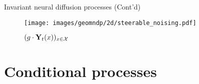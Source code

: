 \begin{frame}{Invariant neural diffusion processes (Cont'd)}
    
    \begin{figure}[t]
    \vspace{-0.5em}
    \centering
        \texttt{[image: images/geomndp/2d/steerable\_noising.pdf]}
        \vspace{-.5em}
        \caption{
            $(g \cdot {\mathbf{Y}}_t(x))_{x \in \mathcal{X}}$
            }
        \label{fig:equiv_noising_model}
    \end{figure}

\end{frame}

\section{Conditional processes}

